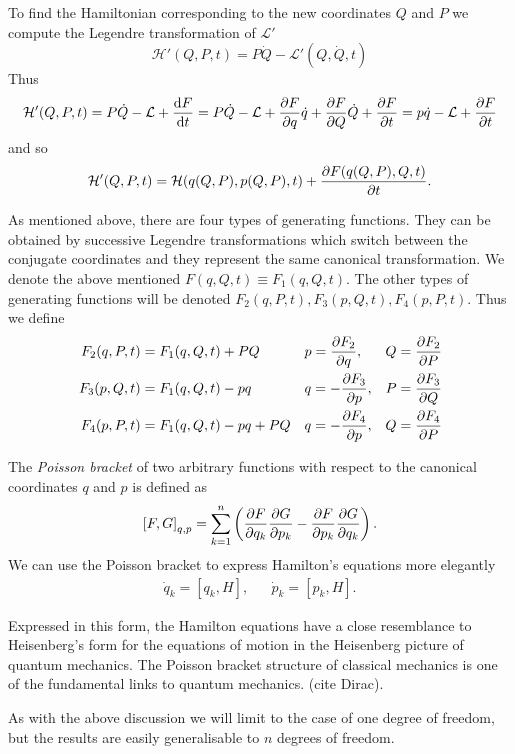 \documentclass[../thesis.tex]{subfiles}
\theoremstyle{plain}
\begin{document}
To find the Hamiltonian corresponding to the new coordinates $Q$ and $P$ we
compute the Legendre transformation of \(\mathcal{L'}\)
\[
  \mathcal{H'}(Q, P, t) = P\dot{Q} - \mathcal{L'}(Q, \dot{Q}, t)
\]
Thus
\[
  \mathcal{H'}(Q, P, t) = P\dot{Q} - \mathcal{L} + \dv{F}{t} =
  P\dot{Q} - \mathcal{L} + \pdv{F}{q} \dot{q} + \pdv{F}{Q} \dot{Q} + \pdv{F}{t} =
  p\dot{q} - \mathcal{L} + \pdv{F}{t}
\]
and so
\begin{equation}
  \label{eq:canonical-transf}
  \mathcal{H'}(Q, P, t) = \mathcal{H}(q(Q,P), p(Q, P), t) + \pdv{F(q(Q,P), Q, t)}{t}.
\end{equation}

As mentioned above, there are four types of generating functions. They can be obtained
by successive Legendre transformations which switch between the conjugate coordinates and
they represent the same canonical transformation. We denote the above mentioned
\(F(q, Q, t) \equiv F_1(q, Q, t)\). The other types of generating functions will be denoted
\(F_2(q, P, t), F_3(p, Q, t), F_4(p, P, t)\). Thus we define
\begin{align*}
  F_2(q, P, t) &= F_1(q, Q, t) + PQ &&
  p = \pdv{F_2}{q}, & Q = \pdv{F_2}{P} \\
  F_3(p, Q, t) &= F_1(q, Q, t) - pq &&
  q = - \pdv{F_3}{p}, & P = \pdv{F_3}{Q} \\
  F_4(p, P, t) &= F_1(q, Q, t) - pq + PQ &&
  q = - \pdv{F_4}{p}, & Q = \pdv{F_4}{P}
\end{align*}

The \emph{Poisson bracket} of two arbitrary functions with respect to the canonical coordinates
$q$ and $p$ is defined as
\[
  {\left[F, G\right]}_{q,p} = \sum_{k=1}^n \left( \pdv{F}{q_k} \pdv{G}{p_k} -
                                                  \pdv{F}{p_k} \pdv{G}{q_k} \right).
\]
We can use the Poisson bracket to express Hamilton's equations more elegantly
\begin{align*}
  \dot{q}_k = [q_k,H], && \dot{p}_k = [p_k,H].
\end{align*}

Expressed in this form, the Hamilton equations have a close resemblance to
Heisenberg's form for the equations of motion in the Heisenberg picture of
quantum mechanics. The Poisson bracket structure of classical mechanics is
one of the fundamental links to quantum mechanics. {\color{red}(cite Dirac)}.

As with the above discussion we will limit to the case of one degree of freedom,
but the results are easily generalisable to $n$ degrees of freedom.
\end{document}
